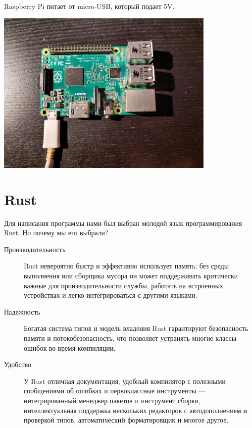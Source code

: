 \documentclass[a4paper,12pt]{article}
\begin{document}
Raspberry Pi питает от micro-USB, который подает 5V.
\begin{center}
  \includegraphics[width=0.8\textwidth]{raspberry.pdf}
\end{center}

\newpage
\section{Rust}
Для написания программы нами был выбран молодой язык программирования Rust. Но почему мы его выбрали?
\begin{description}
  \item[Производительность] Rust невероятно быстр и эффективно использует память:
  без среды выполнения или сборщика мусора он может поддерживать критически важные для
  производительности службы, работать на встроенных устройствах и легко интегрироваться с другими языками.
  \item[Надежность] Богатая система типов и модель владения Rust гарантируют безопасность памяти и потокобезопасность,
  что позволяет устранять многие классы ошибок во время компиляции.
  \item[Удобство] У Rust отличная документация, удобный компилятор с полезными сообщениями об ошибках и первоклассные инструменты
  — интегрированный менеджер пакетов и инструмент сборки, интеллектуальная поддержка нескольких редакторов с автодополнением
   и проверкой типов, автоматический форматировщик и многое другое.
\end{description}
\end{document}
